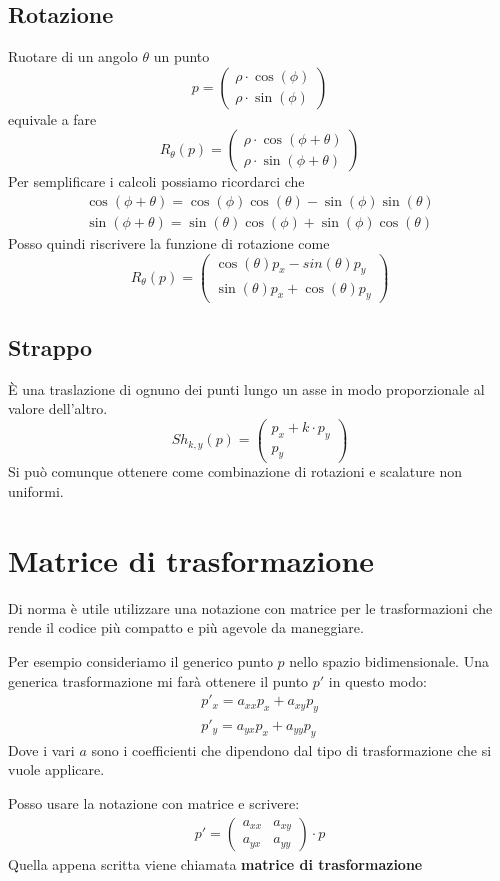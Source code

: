 \subsection{Rotazione}
Ruotare di un angolo $\theta$ un punto
\[
	p = \begin{pmatrix}
		\rho \cdot \cos(\phi) \\
		\rho \cdot \sin(\phi)
	\end{pmatrix}\]
equivale a fare
\[
	R_\theta(p) =
	\begin{pmatrix}
		\rho \cdot \cos(\phi + \theta) \\
		\rho \cdot \sin(\phi + \theta)
	\end{pmatrix}
\]
Per semplificare i calcoli possiamo ricordarci che
\begin{gather*}
	\cos(\phi + \theta) = \cos(\phi) \cos(\theta) - \sin(\phi) \sin(\theta) \\
	\sin(\phi + \theta) = \sin(\theta) \cos(\phi) + \sin(\phi) \cos(\theta)
\end{gather*}
Posso quindi riscrivere la funzione di rotazione come
\[
	R_\theta(p) =
	\begin{pmatrix}
		\cos(\theta)p_x - sin(\theta)p_y \\
		\sin(\theta)p_x + \cos(\theta)p_y
	\end{pmatrix}
\]

\subsection{Strappo}
\`E una traslazione di ognuno dei punti lungo un asse in modo proporzionale al valore
dell'altro.
\[
	Sh_{k, y}(p) =
	\begin{pmatrix}
		p_x + k \cdot p_y \\
		p_y
	\end{pmatrix}
\]
Si pu\`o comunque ottenere come combinazione di rotazioni e scalature non uniformi.

\section{Matrice di trasformazione}
Di norma \`e utile utilizzare una notazione con matrice per le trasformazioni che rende
il codice pi\`u compatto e pi\`u agevole da maneggiare.

Per esempio consideriamo il generico punto $p$ nello spazio bidimensionale. Una generica
trasformazione mi far\`a ottenere il punto $p'$ in questo modo:
\begin{gather*}
	p'_x = a_{xx} p_x + a_{xy} p_y \\
	p'_y = a_{yx} p_x + a_{yy} p_y
\end{gather*}
Dove i vari $a$ sono i coefficienti che dipendono dal tipo di trasformazione che si
vuole applicare.

Posso usare la notazione con matrice e scrivere:
\begin{gather*}
	p' = \begin{pmatrix}
		a_{xx} & a_{xy} \\
		a_{yx} & a_{yy}
	\end{pmatrix} \cdot p
\end{gather*}
Quella appena scritta viene chiamata \textbf{matrice di trasformazione}